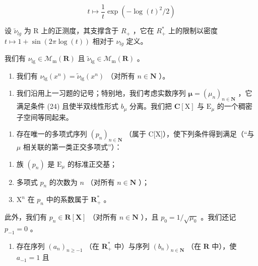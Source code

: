 \[
t \mapsto \frac {1}{t} \exp (- \log (t) ^ {2} / 2)
\]

设 \(\widetilde{\nu}_{lg}\) 为 R 上的正测度，其支撑含于 \(R_{+}\) ，它在 \(R_{+}^{*}\) 上的限制以密度 \(t \mapsto 1 + \sin(2\pi \log(t))\) 相对于 \(\nu_{lg}\) 定义。

我们有 \(\nu_{\mathrm{lg}} \in \mathcal{M}_{\mathrm{m}}(\mathbf{R})\) 且 \(\widetilde{\nu}_{\mathrm{lg}} \in \mathcal{M}_{\mathrm{m}}(\mathbf{R})\) 。

\begin{enumerate}
\def\labelenumi{\roman{enumi})}
\tightlist
\item
  我们有 \(\nu_{\mathrm{lg}}(x^n) = \widetilde{\nu}_{\mathrm{lg}}(x^n)\) （对所有 \(n\in \mathbf{N}\) ）。
\end{enumerate}

\begin{enumerate}
\def\labelenumi{\arabic{enumi})}
\setcounter{enumi}{22}
\tightlist
\item
  我们沿用上一习题的记号；特别地，我们考虑实数序列 \(\boldsymbol{\mu} = (\mu_n)_{n\in \mathbf{N}}\) ，它满足条件 (24) 且使半双线性形式 \(b_{\mu}\) 分离。我们把 \(\mathbf{C}[\mathrm{X}]\) 与 \(\mathrm{E}_{\mu}\) 的一个稠密子空间等同起来。
\end{enumerate}

\begin{enumerate}
\def\labelenumi{\alph{enumi})}
\tightlist
\item
  存在唯一的多项式序列 \((p_{n})_{n\in\mathbf{N}}\) （属于 C{[}X{]}），使下列条件得到满足（“与 \(\mu\) 相关联的第一类正交多项式”）：
\end{enumerate}

\begin{enumerate}
\def\labelenumi{(\roman{enumi})}
\item
  族 \((p_n)\) 是 \(\mathrm{E}_{\mu}\) 的标准正交基；
\item
  多项式 \(p_n\) 的次数为 \(n\) （对所有 \(n \in \mathbf{N}\) ）；
\item
  \(\mathrm{X}^n\) 在 \(p_n\) 中的系数属于 \(\mathbf{R}_+^*\) 。
\end{enumerate}

此外，我们有 \(p_n \in \mathbf{R}[\mathbf{X}]\) （对所有 \(n \in \mathbf{N}\) ），且 \(p_0 = 1 / \sqrt{\mu_0}\) 。我们还记 \(p_{-1} = 0\) 。

\begin{enumerate}
\def\labelenumi{\alph{enumi})}
\setcounter{enumi}{1}
\tightlist
\item
  存在序列 \((a_{n})_{n\geqslant -1}\) （在 \(\mathbf{R}_{+}^{*}\) 中）与序列 \((b_{n})_{n\in \mathbf{N}}\) （在 \(\mathbf{R}\) 中），使 \(a_{-1} = 1\) 且
\end{enumerate}

